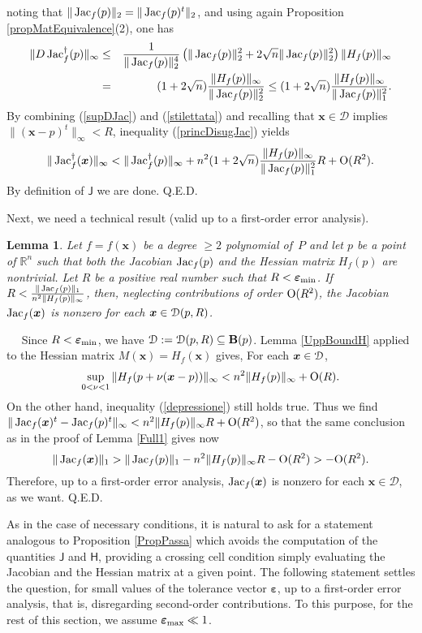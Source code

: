\documentclass[10pt]{article}
\newcommand\qed{{\hspace*{\fill}Q.E.D.\vskip12pt plus 1pt}}
\newcommand\sD{{\cal D}}
\newcommand{\x}{{\bm x}}
\newcommand\proof{\noindent{\em Proof.}\ \ } \newcommand\mult{\mbox{\rm mult}}
\newcommand\R{{\mathbb R}}
\newcommand{\epsbold}{{\bm \varepsilon}}
\def\Jac{\mathop{\rm Jac}\nolimits}
\newtheorem{lemma}[theorem]{Lemma}
\begin{document}
{ noting that $\|\Jac_f(p)\|_2=\|\Jac_f(p)^t\|_2$, and using again Proposition \ref{propMatEquivalence}(2), one has
\begin{eqnarray}\label{stilettata} 
\|D \Jac_f^\dagger(p)\|_\infty
&\le& \frac{1}{\|\Jac_f(p)\|_2^4} \left( 
\|\Jac_f(p)\|_2^2  + 2 \sqrt{n} \|\Jac_f(p)\|^2_2  \right)\|H_f(p)\|_\infty \nonumber \\ 
&=& (1+2 \sqrt{n}) \frac{\|H_f(p)\|_\infty}{\|\Jac_f(p)\|_2^2}    
\le  (1+2\sqrt{n}) \frac{\|H_f(p)\|_\infty}{\|\Jac_f(p)\|_1^2}.  
\end{eqnarray}
By combining (\ref{supDJac}) and (\ref{stilettata}) and recalling that 
$\x \in \mathcal D$ implies $\|(\x-p)^t\|_\infty<R$, inequality (\ref{princDisugJac}) yields
$$
\|\Jac_f^\dagger(\x)\|_\infty <    
 \|\Jac_f^\dagger(p)\|_\infty  + n^2 (1+2\sqrt{n}) \frac{\|H_f(p)\|_\infty}{\|\Jac_f(p)\|_1^2}R+
{\rm O}(R^2).
$$
By definition of $\mathsf J$  we are done.
\qed



Next, we need a technical result (valid up to a first-order  error analysis).

\begin{lemma}\label{Full2} 
Let $f=f(\x)$ be a degree $\geq 2$ polynomial of~$P$ and 
let $p$ be a point of $\R^n$ such  that both  the Jacobian  $\Jac_f(p)$  and the Hessian matrix  $H_f(p)$  are nontrivial.
Let $R$ be a positive real number such that $R < \epsbold_{{\rm min}}$.
If  $R<\frac{\|\Jac_f(p)\|_1}{n^2 \|H_f(p)\|_\infty}$,
then, neglecting contributions of order ${\rm O}(R^2)$,
the Jacobian ${\rm Jac}_f(\x)$ is nonzero   for each  $\x
\in \sD(p,R)$.
\end{lemma}
\proof 
Since $R < \epsbold_{{\rm min}}$, we have $ \sD:=\sD(p,R)\subseteq {\bf B}(p)$.
  Lemma \ref{UppBoundH} applied  to the Hessian matrix $M(\x)=H_f(\x)$ gives, For each $\x\in \sD$,
$$
\sup_{0<\nu<1} \|H_f(p+\nu(\x-p))\|_\infty <n^2 \| H_f(p)\|_{\infty} + {\rm O}(R).
$$
On the other hand, inequality (\ref{depressione})  still holds true.
Thus we find
$
\|\Jac_f(\x)^t - \Jac_f(p)^t\|_\infty <n^2 \| H_f(p)\|_{\infty}R + {\rm O}(R^2)$,
so that  the same conclusion as in the  proof of Lemma \ref{Full1} gives now
$$
\|\Jac_f(\x)\|_1 > \|\Jac_f(p)\|_1 - n^2\|H_f(p)\|_\infty R -{\rm O}(R^2)>- {\rm O}(R^2).
$$ 
Therefore,  up to a first-order error analysis,  $\Jac_f(\bm x)$ 
is nonzero   for each $\x \in \mathcal D$, as we want.
\qed


As in the case  of necessary conditions,  it is natural to ask for a statement analogous  to Proposition \ref{PropPassa} which  avoids the computation of   the quantities ${\mathsf J}$ and ${\mathsf H}$,   providing  a  crossing cell condition simply  evaluating  
    the Jacobian and the Hessian matrix at a  given point.  The following statement  settles the question,   for small values of  the tolerance vector $\epsbold$, up to a  first-order error analysis, that is,  disregarding  second-order contributions. To this purpose, for the rest of this section, we assume  $\epsbold_{\rm max}\ll 1$.




}
\end{document}
